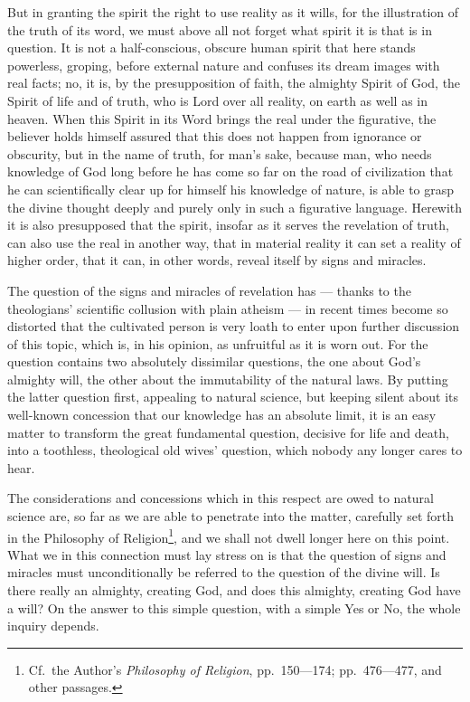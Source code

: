 \documentclass[12pt,a4paper,openany]{book}
\newcommand{\opage}[1]{\marginnote{\footnotesize\textit{[#1]}}}
\begin{document}
But in granting the spirit the right to
use reality as it wills, for the illustration
of the truth of its word, we must above all not
\setcounter{footnote}{0}%
\opage{307}forget what spirit it is that is in question.
It is not a half-conscious, obscure human spirit that
here stands powerless, groping, before external nature
and confuses its dream images with real facts;
no, it is, by the presupposition of faith,
the almighty Spirit of God, the Spirit of life and of truth,
who is Lord over all reality, on earth as well as
in heaven. When this Spirit in its Word brings the
real under the figurative, the
believer holds himself assured that this does not happen from ignorance
or obscurity, but in the name of truth, for
man's sake, because man, who needs
knowledge of God long before he has come so far on the road of civilization
that he can scientifically clear up for himself his
knowledge of nature, is able to grasp the divine thought deeply and
purely only in such a figurative language. Herewith it is also
presupposed that the spirit, insofar as it
serves the revelation of truth, can also
use the real in another way, that in material
reality it can set a reality of
higher order, that it can, in other words, reveal
itself by signs and miracles.

The question of the signs and miracles of revelation
has --- thanks to the theologians' scientific collusion
with plain atheism --- in recent times become so
distorted that the cultivated person is very loath to enter upon
further discussion of this topic, which is, in his opinion,
as unfruitful as it is worn out. For the question
contains two absolutely dissimilar questions,
the one about God's almighty will, the other about
the immutability of the natural laws. By putting the latter
\setcounter{footnote}{0}%
\opage{308}question first, appealing to natural science,
but keeping silent about its well-known concession that our knowledge has an
absolute limit, it is an easy matter to transform
the great fundamental question, decisive for life and death, into
a toothless, theological old wives' question, which nobody
any longer cares to hear.

The considerations and concessions which in this respect
are owed to natural science are, so far as we are able to
penetrate into the matter, carefully set forth in the Philosophy of Religion\footnote[1]{Cf.\ the Author's \emph{Philosophy of Religion}, pp.\ 150---174; pp.\ 476---477, and other passages.}, and we shall not dwell longer here on
this point. What we in this connection must
lay stress on is that the question of signs and miracles
must unconditionally be referred to the question of the
divine will. Is there really an almighty,
creating God, and does this almighty, creating God
have a will? On the answer to this simple question, with
a simple Yes or No, the whole inquiry depends.
\end{document}
